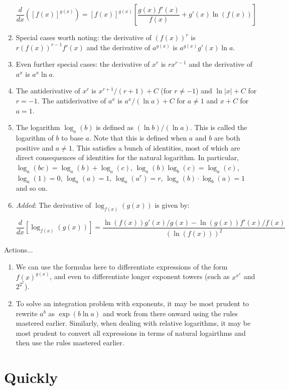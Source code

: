 \documentclass[10pt]{amsart}
\begin{document}
\begin{enumerate}
  $$\frac{d}{dx} \left([f(x)]^{g(x)}\right) = [f(x)]^{g(x)}\left[\frac{g(x)f'(x)}{f(x)} + g'(x)\ln(f(x))\right]$$
\item Special cases worth noting: the derivative of $(f(x))^r$ is
  $r(f(x))^{r-1}f'(x)$ and the derivative of $a^{g(x)}$ is
  $a^{g(x)}g'(x) \ln a$.
\item Even further special cases: the derivative of $x^r$ is
  $rx^{r-1}$ and the derivative of $a^x$ is $a^x \ln a$.
\item The antiderivative of $x^r$ is $x^{r+1}/(r + 1) + C$ (for $r \ne
  -1$) and $\ln|x| + C$ for $r = -1$. The antiderivative of $a^x$ is
  $a^x/(\ln a) + C$ for $a \ne 1$ and $x + C$ for $a = 1$.
\item The logarithm $\log_a(b)$ is defined as $(\ln b)/(\ln a)$. This
  is called the logarithm of $b$ to base $a$. Note that this is
  defined when $a$ and $b$ are both positive and $a \ne 1$. This
  satisfies a bunch of identities, most of which are direct
  consequences of identities for the natural logarithm. In particular,
  $\log_a(bc) = \log_a(b) + \log_a(c)$, $\log_a(b)\log_b(c) =
  \log_a(c)$, $\log_a(1) = 0$, $\log_a(a) = 1$, $\log_a(a^r) = r$,
  $\log_a(b) \cdot \log_b(a) = 1$ and so on.
\item {\em Added}: The derivative of $\log_{f(x)}(g(x))$ is given by:

  $$\frac{d}{dx}\left[\log_{f(x)}(g(x))\right] = \frac{\ln(f(x))g'(x)/g(x) - \ln(g(x))f'(x)/f(x)}{(\ln(f(x)))^2}$$
\end{enumerate}

Actions...

\begin{enumerate}
\item We can use the formulas here to differentiate expressions of the
  form $f(x)^{g(x)}$, and even to differentiate longer exponent towers
  (such as $x^{x^x}$ and $2^{2^x}$).
\item To solve an integration problem with exponents, it may be most
  prudent to rewrite $a^b$ as $\exp(b \ln a)$ and work from there
  onward using the rules mastered earlier. Similarly, when dealing
  with relative logarithms, it may be most prudent to convert all
  expressions in terms of natural logairthms and then use the rules
  mastered earlier.
\end{enumerate}

\section{Quickly}
\end{document}
